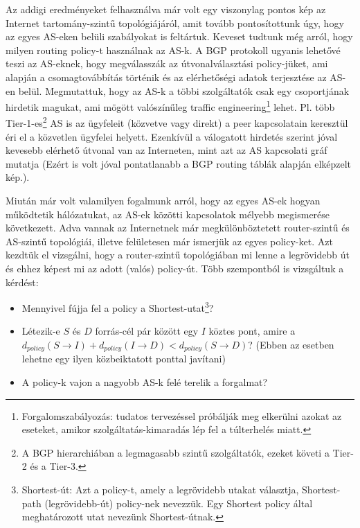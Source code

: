   Az addigi eredményeket felhasználva már volt egy viszonylag pontos kép az Internet tartomány-szintű topológiájáról, amit tovább pontosítottunk úgy, hogy az egyes AS-eken belüli szabályokat is feltártuk. Keveset tudtunk még arról, hogy milyen routing policy-t használnak az AS-k. A BGP protokoll ugyanis lehetővé teszi az AS-eknek, hogy megválasszák az útvonalválasztási policy-jüket, ami alapján a csomagtovábbítás történik és az elérhetőségi adatok terjesztése az AS-en belül. Megmutattuk, hogy az AS-k a többi szolgáltatók csak egy csoportjának hirdetik magukat, ami mögött valószínűleg traffic engineering\footnote{Forgalomszabályozás: tudatos tervezéssel próbálják meg elkerülni azokat az eseteket, amikor szolgáltatás-kimaradás lép fel a túlterhelés miatt.} lehet. Pl. több Tier-1-es\footnote{A BGP hierarchiában a legmagasabb szintű szolgáltatók, ezeket követi a Tier-2 és a Tier-3.} AS is az ügyfeleit (közvetve vagy direkt) a peer kapcsolatain keresztül éri el a közvetlen ügyfelei helyett. Ezenkívül a válogatott hirdetés szerint jóval kevesebb elérhető útvonal van az Interneten, mint azt az AS kapcsolati gráf mutatja (Ezért is volt jóval pontatlanabb a BGP routing táblák alapján elképzelt kép.)\cite{On_Inferring_and_Characterizing_Internet_Routing_Policies}.

  Miután már volt valamilyen fogalmunk arról, hogy az egyes AS-ek hogyan működtetik hálózatukat, az AS-ek közötti kapcsolatok mélyebb megismerése következett. Adva vannak az Internetnek már megkülönböztetett router-szintű és AS-szintű topológiái, illetve felületesen már ismerjük az egyes policy-ket. Azt kezdtük el vizsgálni, hogy a router-szintű topológiában mi lenne a legrövidebb út és ehhez képest mi az adott (valós) policy-út\cite{The_Impact_of_Routing_Policy_on_Internet_Paths}. Több szempontból is vizsgáltuk a kérdést:
  \begin{itemize}
    \item Mennyivel fújja fel a policy a Shortest-utat\footnote{Shortest-út: Azt a policy-t, amely a legrövidebb utakat választja, Shortest-path (legrövidebb-út) policy-nek nevezzük. Egy Shortest policy által meghatározott utat nevezünk Shortest-útnak.}?
    \item Létezik-e $S$ és $D$ forrás-cél pár között egy $I$ köztes pont, amire a $d_{policy}( S \rightarrow I ) + d_{policy}( I \rightarrow D ) < d_{policy}( S \rightarrow D )$? (Ebben az esetben lehetne egy ilyen közbeiktatott ponttal javítani)
    \item A policy-k vajon a nagyobb AS-k felé terelik a forgalmat?
  \end{itemize}

